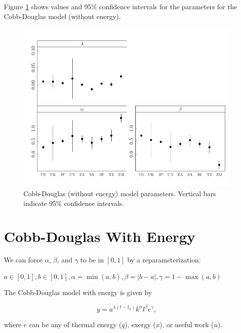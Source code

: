 \documentclass[preprint,authoryear,12pt]{elsarticle}\usepackage{graphicx, color}
\makeatletter
\def\maxwidth{ %
  \ifdim\Gin@nat@width>\linewidth
    \linewidth
  \else
    \Gin@nat@width
  \fi
}
\newenvironment{knitrout}{}{} %
\makeatother
\begin{document}
Figure \ref{fig:CD_Params_Graph} shows values and 95\% confidence intervals for the parameters for the Cobb-Douglas model (without energy).

\begin{knitrout}
\color{fgcolor}\begin{figure}[]

\includegraphics[width=\maxwidth]{figure/CD_Params_Graph} \caption[Cobb-Douglas (without energy) model parameters]{Cobb-Douglas (without energy) model parameters. Vertical bars indicate 95\% confidence intervals.\label{fig:CD_Params_Graph}}
\end{figure}


\end{knitrout}


\section{Cobb-Douglas With Energy}

We can force $\alpha$, $\beta$, and $\gamma$ to be in $[0,1]$ by a reparameterization:

$a \in[0,1], b \in [0,1], \alpha=\min(a,b), \beta=|b-a|, \gamma = 1-\max(a,b)$

The Cobb-Douglas model with energy is given by

\begin{equation} \label{eq:CD_With_Energy}
  y = a^{\lambda (t-t_0)}k^{\alpha}l^{\beta}e^{\gamma},
\end{equation}

\noindent where $e$ can be any of thermal energy ($q$), exergy ($x$), or useful work ($u$).
\end{document}
